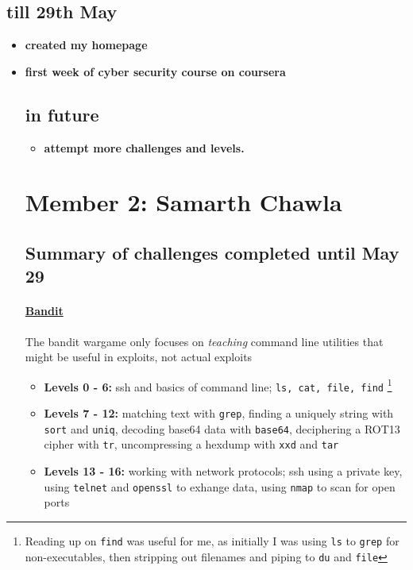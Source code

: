 \documentclass{article}
\def\code#1{\texttt{#1}}
\begin{document}
\subsection*{till 29th May}
\begin{itemize}
    \item \textbf{created my homepage}
    \item \textbf{first week of cyber security course on coursera}
        \subsection*{in future}
        \begin{itemize}
            \item \textbf{attempt more challenges and levels.}
        \end{itemize}

        \newpage
        \section*{Member 2: Samarth Chawla}
        \subsection*{Summary of challenges completed until May 29}

        \paragraph{\href{http://overthewire.org/wargames/bandit/}{Bandit}}
        The bandit wargame only focuses on \textit{teaching} command line utilities that might be useful in exploits, not actual exploits
        \begin{itemize}

            \item \textbf{Levels 0 - 6: } ssh and basics of command line; \code{ls, cat, file, find} \footnote{Reading up on \code{find} was useful for me, as initially I was using \code{ls} to \code{grep} for non-executables, then stripping out filenames and piping to \code{du} and \code{file}}

            \item \textbf{Levels 7 - 12: } matching text with \code{grep}, finding a uniquely string with \code{sort} and \code{uniq}, decoding base64 data with \code{base64}, deciphering a ROT13 cipher with \code{tr}, uncompressing a hexdump with \code{xxd} and \code{tar}

            \item \textbf{Levels 13 - 16: } working with network protocols; ssh using a private key, using \code{telnet} and \code{openssl} to exhange data, using \code{nmap} to scan for open ports


\end{itemize}
\end{itemize}
\end{document}
